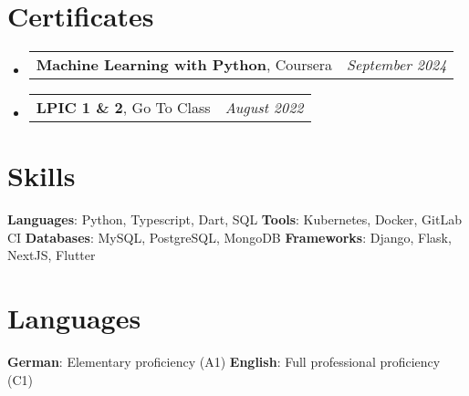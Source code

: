 \documentclass[letterpaper,11pt]{article}
\makeatletter
\newcommand{\resumeSubHeadingListStart}{\begin{itemize}[leftmargin=*]}
\newcommand{\resumeSubHeadingListEnd}{\end{itemize}}
\newcommand{\titleWithDescription}[2]{\textbf{#1}{: #2}}
\newcommand{\resumeLanguages}[4]{
  \section{Languages}
    \noindent
    \titleWithDescription{#1}{#2}
    \hfill
    \titleWithDescription{#3}{#4}
}
\newcommand{\certificateItem}[3]{
  \item\begin{tabular*}{0.97\textwidth}{l@{\extracolsep{\fill}}r}
    \small{
      \textbf{#1}{, #2 \vspace{-2pt}}
    } & \textit{\small #3} \\
  \end{tabular*}\vspace{-5pt}
}
\makeatother
\begin{document}
\section{Certificates}
  \resumeSubHeadingListStart
    \certificateItem
      {Machine Learning with Python}
      {Coursera}
      {September 2024}

    \certificateItem
      {LPIC 1 \& 2}
      {Go To Class}
      {August 2022}

  \resumeSubHeadingListEnd

%
\section{Skills}

  \titleWithDescription{Languages}{Python, Typescript, Dart, SQL}
  \hfill
  \titleWithDescription{Tools}{Kubernetes, Docker, GitLab CI}\vspace{2pt}
  \newline
  \titleWithDescription{Databases}{MySQL, PostgreSQL, MongoDB}
  \hfill
  \titleWithDescription{Frameworks}{Django, Flask, NextJS, Flutter}

\resumeLanguages
  {German}
  {Elementary proficiency (A1)}
  {English}
  {Full professional proficiency (C1)}

\end{document}

